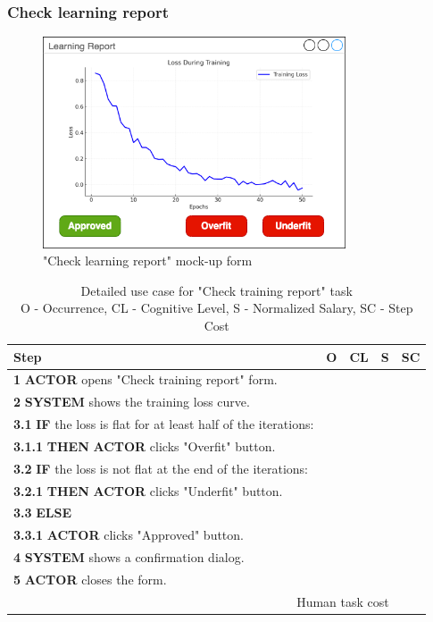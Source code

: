 \subsubsection{Check learning report}

\begin{figure}[H]
\centering
\includegraphics[width=0.8\textwidth]{figures/check_learning_report.png}
\caption{"Check learning report" mock-up form}
\end{figure}

\begin{table}[H]
\centering
\begin{tabularx}{\textwidth}{|X|c|c|c|c|}
\hline
\textbf{Step} & \textbf{O} & \textbf{CL} & \textbf{S} & \textbf{SC} \\
\hline
\textbf{1} \textbf{ACTOR} opens "Check training report" form. & & & & \\
\hline
\textbf{2} \textbf{SYSTEM} shows the training loss curve. & & & & \\
\hline
\textbf{3.1} \textbf{IF} the loss is flat for at least half of the iterations: & & & & \\
\hline
\textbf{3.1.1} \textbf{THEN} \textbf{ACTOR} clicks "Overfit" button. & & & & \\
\hline
\textbf{3.2} \textbf{IF} the loss is not flat at the end of the iterations: & & & & \\
\hline
\textbf{3.2.1} \textbf{THEN} \textbf{ACTOR} clicks "Underfit" button. & & & & \\
\hline
\textbf{3.3} \textbf{ELSE} & & & & \\
\hline
\textbf{3.3.1} \textbf{ACTOR} clicks "Approved" button. & & & & \\
\hline
\textbf{4} \textbf{SYSTEM} shows a confirmation dialog. & & & & \\
\hline
\textbf{5} \textbf{ACTOR} closes the form. & & & & \\
\hline
\multicolumn{4}{|r|}{Human task cost} & \\
\hline
\end{tabularx}
\caption{Detailed use case for "Check training report" task\\ 
O - Occurrence, CL - Cognitive Level, S - Normalized Salary, SC - Step Cost}
\label{table:check_training_report}
\end{table}

